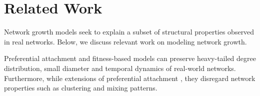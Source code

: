 
\section{Related Work}
\label{sec:Related Work}
Network growth models seek to explain a subset of structural properties observed in real
networks. Below, we discuss relevant work on modeling network growth.

Preferential attachment and fitness-based models \cite{bell2017network,medo2011temporal,bianconi2001bose,caldarelli2002scale}
can preserve heavy-tailed degree distribution, small diameter \cite{bollobas2004diameter} and temporal dynamics \cite{wang2013quantifying}
of real-world networks. Furthermore, while extensions of preferential attachment \cite{mossa2002truncation,zeng2005construction,wang2009local},
they disregard network properties such as clustering and mixing patterns.



